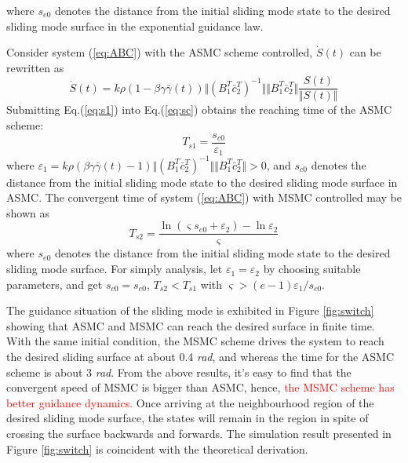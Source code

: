\documentclass[3p]{elsarticle}
\theoremstyle{plain}
\begin{document}
where $s_{e0}$ denotes the distance from the initial sliding mode state to the desired sliding mode surface in the exponential guidance law.\par
Consider system (\ref{eq:ABC}) with the ASMC scheme controlled, $\dot{S}(t)$ can be rewritten as
\begin{equation}
\dot{S}(t)= k\rho(1-\beta\gamma\bar{\gamma}(t))\Vert(B_1^T\bar{c}^T_2)^{-1}\Vert \Vert B^T_1\bar{c}_2^T\Vert \frac{S(t)}{\Vert S(t)\Vert}\label{eq:s1}
\end{equation}
Submitting Eq.(\ref{eq:s1}) into Eq.(\ref{eq:sc}) obtains the reaching time of the ASMC scheme:
\begin{equation}
T_{s1} = \frac{s_{c0}}{\varepsilon_1}
\end{equation}
where $\varepsilon_1 = k\rho(\beta\gamma\bar{\gamma}(t)-1)\Vert(B_1^T\bar{c}^T_2)^{-1}\Vert \Vert B^T_1\bar{c}_2^T\Vert > 0$, and $s_{c0}$ denotes the distance from the initial sliding mode state to the desired sliding mode surface in ASMC. The convergent time of system (\ref{eq:ABC}) with MSMC controlled may be shown as
\begin{equation}
T_{s2} = \frac{\ln (\varsigma s_{e0}+\varepsilon_2)-\ln\varepsilon_2}{\varsigma}
\end{equation}
where $s_{e0}$ denotes the distance from the initial sliding mode state to the desired sliding mode surface. For simply analysis, let $\varepsilon_1 = \varepsilon_2$ by choosing suitable parameters,  and get $s_{c0}=s_{e0}$, $T_{s2}<T_{s1}$ with $\varsigma>(e-1)\varepsilon_1/s_{c0}$.\par
The guidance situation of the sliding mode is exhibited in Figure \ref{fig:switch} showing that ASMC and MSMC can reach the desired surface in finite time. With the same initial condition, the MSMC scheme drives the system to reach the desired sliding surface at about 0.4 \textit{rad}, and whereas the time for the ASMC scheme is about 3 \textit{rad}. From the above results, it's easy to find that the convergent speed of MSMC is bigger than ASMC, hence, \textcolor{red}{the MSMC scheme has better guidance dynamics.} Once arriving at the neighbourhood region of the desired sliding mode surface, the states will remain in the region in spite of crossing the surface backwards and forwards. The simulation result presented in Figure \ref{fig:switch} is coincident with the theoretical derivation.\par
\end{document}
